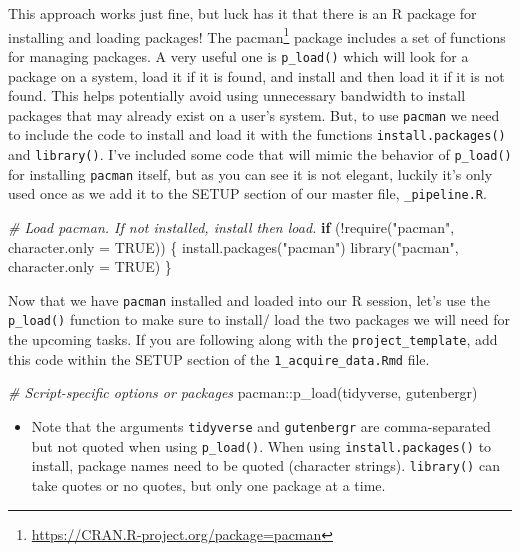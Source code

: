 \documentclass[
]{article}
\newenvironment{Shaded}{\begin{snugshade}}{\end{snugshade}}
\newcommand{\AttributeTok}[1]{\textcolor[rgb]{0.77,0.63,0.00}{#1}}
\newcommand{\CommentTok}[1]{\textcolor[rgb]{0.56,0.35,0.01}{\textit{#1}}}
\newcommand{\ConstantTok}[1]{\textcolor[rgb]{0.00,0.00,0.00}{#1}}
\newcommand{\ControlFlowTok}[1]{\textcolor[rgb]{0.13,0.29,0.53}{\textbf{#1}}}
\newcommand{\FunctionTok}[1]{\textcolor[rgb]{0.00,0.00,0.00}{#1}}
\newcommand{\NormalTok}[1]{#1}
\newcommand{\SpecialCharTok}[1]{\textcolor[rgb]{0.00,0.00,0.00}{#1}}
\newcommand{\StringTok}[1]{\textcolor[rgb]{0.31,0.60,0.02}{#1}}
\DeclareRobustCommand{\href}[2]{#2\footnote{\url{#1}}}
\newenvironment{rmdblock}[1]
  {\begin{shaded*}
  \begin{itemize}
  \renewcommand{\labelitemi}{
    \raisebox{-.5\height}[0pt][0pt]{
      {\setkeys{Gin}{width=2em,keepaspectratio}\texttt{[image: assets/images/\#1]}}
    }
  }
  \item
  }
  {
  \end{itemize}
  \end{shaded*}
  }
\newenvironment{rmdwarning}
  {\begin{rmdblock}{warning}}
  {\end{rmdblock}}
\begin{document}
This approach works just fine, but luck has it that there is an R package for installing and loading packages! The \href{https://CRAN.R-project.org/package=pacman}{pacman} package includes a set of functions for managing packages. A very useful one is \texttt{p\_load()} which will look for a package on a system, load it if it is found, and install and then load it if it is not found. This helps potentially avoid using unnecessary bandwidth to install packages that may already exist on a user's system. But, to use \texttt{pacman} we need to include the code to install and load it with the functions \texttt{install.packages()} and \texttt{library()}. I've included some code that will mimic the behavior of \texttt{p\_load()} for installing \texttt{pacman} itself, but as you can see it is not elegant, luckily it's only used once as we add it to the SETUP section of our master file, \texttt{\_pipeline.R}.

\begin{Shaded}
\begin{Highlighting}[]
\CommentTok{\# Load \textasciigrave{}pacman\textasciigrave{}. If not installed, install then load.}
\ControlFlowTok{if}\NormalTok{ (}\SpecialCharTok{!}\FunctionTok{require}\NormalTok{(}\StringTok{"pacman"}\NormalTok{, }\AttributeTok{character.only =} \ConstantTok{TRUE}\NormalTok{)) \{}
    \FunctionTok{install.packages}\NormalTok{(}\StringTok{"pacman"}\NormalTok{)}
    \FunctionTok{library}\NormalTok{(}\StringTok{"pacman"}\NormalTok{, }\AttributeTok{character.only =} \ConstantTok{TRUE}\NormalTok{)}
\NormalTok{\}}
\end{Highlighting}
\end{Shaded}

Now that we have \texttt{pacman} installed and loaded into our R session, let's use the \texttt{p\_load()} function to make sure to install/ load the two packages we will need for the upcoming tasks. If you are following along with the \texttt{project\_template}, add this code within the SETUP section of the \texttt{1\_acquire\_data.Rmd} file.

\begin{Shaded}
\begin{Highlighting}[]
\CommentTok{\# Script{-}specific options or packages}
\NormalTok{pacman}\SpecialCharTok{::}\FunctionTok{p\_load}\NormalTok{(tidyverse, gutenbergr)}
\end{Highlighting}
\end{Shaded}

\begin{rmdwarning}
Note that the arguments \texttt{tidyverse} and \texttt{gutenbergr} are
comma-separated but not quoted when using \texttt{p\_load()}. When using
\texttt{install.packages()} to install, package names need to be quoted
(character strings). \texttt{library()} can take quotes or no quotes,
but only one package at a time.
\end{rmdwarning}
\end{document}
